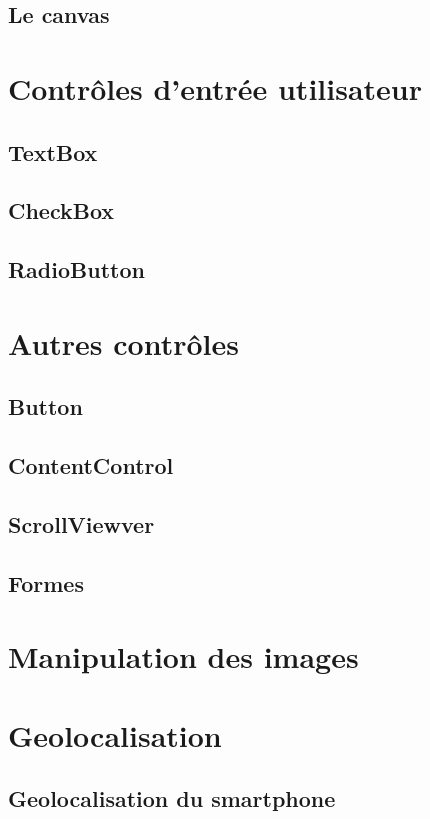 \documentclass[twoside,UTF8]{EPURapport}
\begin{document}
		\subsection{Le canvas}

	\section{Contrôles d'entrée utilisateur}
		\subsection{TextBox}
		\subsection{CheckBox}
		\subsection{RadioButton}
		
	\section{Autres contrôles}
		\subsection{Button}
		\subsection{ContentControl}
		\subsection{ScrollViewver}
		\subsection{Formes}
		
	\section{Manipulation des images}
	
	\section{Geolocalisation}
		\subsection{Geolocalisation du smartphone}
		
\end{document}
